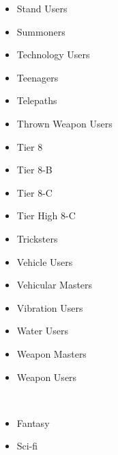 \documentclass[a4paper,12pt]{article}
\begin{document}
\begin{itemize}
\item Stand Users
\item Summoners
\item Technology Users
\item Teenagers
\item Telepaths
\item Thrown Weapon Users
\item Tier 8
\item Tier 8-B
\item Tier 8-C
\item Tier High 8-C
\item Tricksters
\item Vehicle Users
\item Vehicular Masters
\item Vibration Users
\item Water Users
\item Weapon Masters
\item Weapon Users
\end{itemize}\\ \par \vspace{0.5cm}

\begin{itemize}
\item Fantasy
\item Sci-fi
\end{itemize}\\ \par \vspace{0.5cm}
\end{document}
